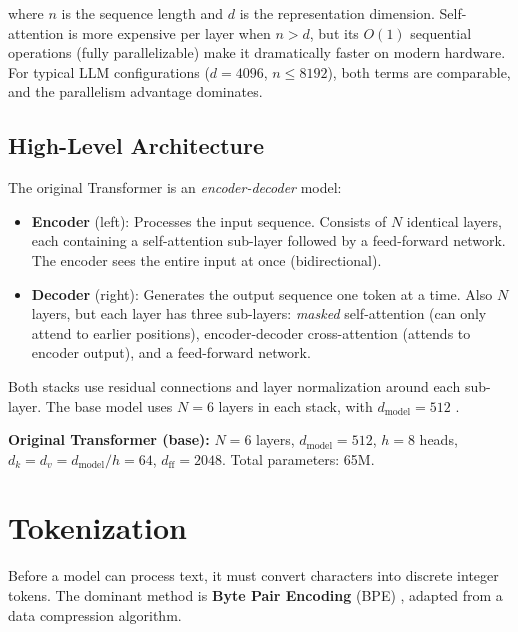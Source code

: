 \documentclass[11pt,a4paper]{article}
\newcommand{\dmodel}{d_{\text{model}}}
\newcommand{\dff}{d_{\text{ff}}}
\newcommand{\dk}{d_k}
\newcommand{\dv}{d_v}
\begin{document}
\noindent where $n$ is the sequence length and $d$ is the representation dimension.
Self-attention is more expensive per layer when $n > d$, but its $O(1)$ sequential
operations (fully parallelizable) make it dramatically faster on modern hardware. For
typical LLM configurations ($d = 4096$, $n \leq 8192$), both terms are comparable, and
the parallelism advantage dominates.

\subsection{High-Level Architecture}

The original Transformer is an \emph{encoder-decoder} model:

\begin{itemize}[nosep]
  \item \textbf{Encoder} (left): Processes the input sequence. Consists of $N$ identical
    layers, each containing a self-attention sub-layer followed by a feed-forward network.
    The encoder sees the entire input at once (bidirectional).
  \item \textbf{Decoder} (right): Generates the output sequence one token at a time.
    Also $N$ layers, but each layer has three sub-layers: \emph{masked} self-attention
    (can only attend to earlier positions), encoder-decoder cross-attention (attends to
    encoder output), and a feed-forward network.
\end{itemize}

Both stacks use residual connections and layer normalization around each sub-layer.
The base model uses $N = 6$ layers in each stack, with $\dmodel = 512$
\cite{vaswani2017}.

\begin{dimbox}
\textbf{Original Transformer (base):}
$N = 6$ layers, $\dmodel = 512$, $h = 8$ heads,
$\dk = \dv = \dmodel / h = 64$, $\dff = 2048$.
Total parameters: 65M.
\end{dimbox}


\section{Tokenization}
\label{sec:tokenization}

Before a model can process text, it must convert characters into discrete integer tokens.
The dominant method is \textbf{Byte Pair Encoding} (BPE) \cite{sennrich2016}, adapted from
a data compression algorithm.
\end{document}
